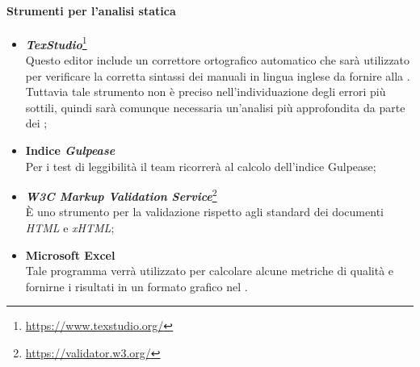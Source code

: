 	\paragraph{Strumenti per l'analisi statica}
	\begin{itemize}
		\item \emph{\textbf{\emph{TexStudio}}}\footnote{\href{https://www.texstudio.org/}{https://www.texstudio.org/}}
		~\\Questo editor include un correttore ortografico automatico che sarà utilizzato per verificare la corretta sintassi dei manuali in lingua inglese da fornire alla \proponente. Tuttavia tale strumento non è preciso nell'individuazione degli errori più sottili, quindi sarà comunque necessaria un'analisi più approfondita da parte dei \vers;
		\item \textbf{Indice \emph{Gulpease}}
		~\\Per i test di leggibilità il team ricorrerà al calcolo dell'indice Gulpease;
		\begin{comment}
		\item 
		\emph{\textbf{\emph{JSHint}}}\ped{G}\footnote{\href{http://jshint.com/}{http://jshint.com/}}
		~\\È uno strumento \emph{OpenSource}\ped{G} funzionale alla rilevazione degli errori e possibili problemi nel codice \emph{JavaScript}\ped{G};
		\item 
		\emph{\textbf{\emph{Draw.io}}}\ped{G}\footnote{\href{https://www.draw.io/}{https://www.draw.io/}}
		\\È un software per la creazione di diagrammi di flusso, di processo, organigrammi, UML, ER e diagrammi di rete.
		\end{comment}
		
		
		\item \textbf{\emph{W3C Markup Validation Service}}\footnote{\href{https://validator.w3.org/}{https://validator.w3.org/}}
		~\\È uno strumento per la validazione rispetto agli standard dei documenti \emph{HTML} e \emph{xHTML};
		
		\item \textbf{Microsoft Excel}
		~\\Tale programma verrà utilizzato per calcolare alcune metriche di qualità e fornirne i risultati in un formato grafico nel \PdQ.
		
	\end{itemize}

